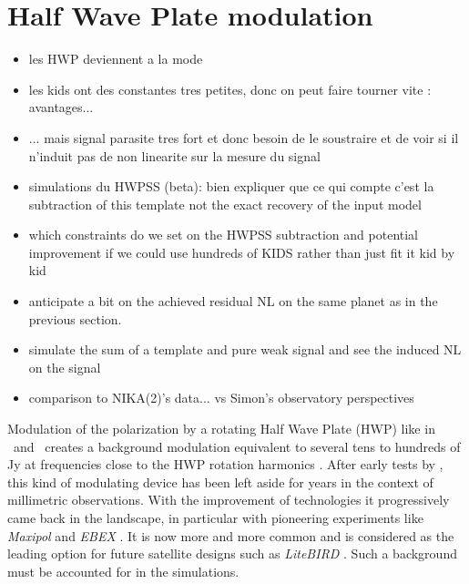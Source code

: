 
\section{Half Wave Plate modulation}

\begin{itemize}
\item les HWP deviennent a la mode
\item les kids ont des constantes tres petites, donc on peut faire tourner vite
  : avantages...
\item ... mais signal parasite tres fort et donc besoin de le soustraire et de
  voir si il n'induit pas de non linearite sur la mesure du signal
\item simulations du HWPSS (beta): bien expliquer que ce qui compte c'est la
  subtraction of this template not the exact recovery of the input model
\item which constraints do we set on the HWPSS subtraction and potential
  improvement if we could use hundreds of KIDS rather than just fit it kid by kid
\item anticipate a bit on the achieved residual NL on the same planet as in the
  previous section.
\item simulate the sum of a template and pure weak signal and see the induced NL
  on the signal
\item comparison to NIKA(2)'s data... vs Simon's observatory perspectives
\end{itemize}

{\color{blue}
Modulation of the polarization by a rotating Half Wave Plate (HWP) like in
\nika\ and \nikad\ creates a background modulation equivalent to several tens to
hundreds of Jy at frequencies close to the HWP rotation harmonics
\citep{2017A&A...599A..34R}. After early tests by , this kind of modulating device has been left aside for
 years in the context of millimetric observations. With the
improvement of technologies it progressively came back in the landscape, in
particular with pioneering experiments like \emph{Maxipol}
\citep{2007ApJ...665...42J} and \emph{EBEX} \citep{2010SPIE.7741E..1CR}. It is
now more and more common and is considered as the leading option for future
satellite designs such as \emph{LiteBIRD} . Such a background must
be accounted for in the simulations.}